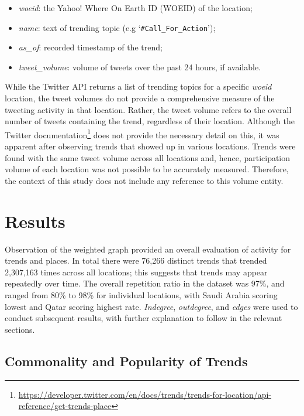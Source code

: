 \documentclass{llncs}
\begin{document}
\begin{itemize}
\item {\emph{woeid}}: the Yahoo! Where On Earth ID (WOEID) of the location;
\item {\emph{name}}: text of trending topic (e.g `{\texttt{\#Call\_For\_Action}}');
\item {\emph{as\_of}}: recorded timestamp of the trend;
\item {\emph{tweet\_volume}}: volume of tweets over the past 24 hours, if available.
\end{itemize}

While the Twitter API returns a list of trending topics for a specific
{\emph{woeid}} location, the tweet volumes do not provide a
comprehensive measure of the tweeting activity in that
location. Rather, the tweet volume refers to the overall number of
tweets containing the trend, regardless of their location. Although
the Twitter
documentation\footnote{\url{https://developer.twitter.com/en/docs/trends/trends-for-location/api-reference/get-trends-place}}
does not provide the necessary detail on this, it was apparent after
observing trends that showed up in various locations. Trends were
found with the same tweet volume across all locations and, hence,
participation volume of each location was not possible to be
accurately measured. Therefore, the context of this study does not
include any reference to this volume entity.


\section{Results}\label{results}

Observation of the weighted graph provided an overall evaluation of
activity for trends and places. In total there were 76,266 distinct
trends that trended 2,307,163 times across all locations; this
suggests that trends may appear repeatedly over time. The overall
repetition ratio in the dataset was 97\%, and ranged from 80\% to 98\%
for individual locations, with Saudi Arabia scoring lowest and Qatar
scoring highest rate. {\emph{Indegree}}, {\emph{outdegree}}, and
{\emph{edges}} were used to conduct subsequent results, with further
explanation to follow in the relevant sections.

\subsection{Commonality and Popularity of Trends}
\end{document}
